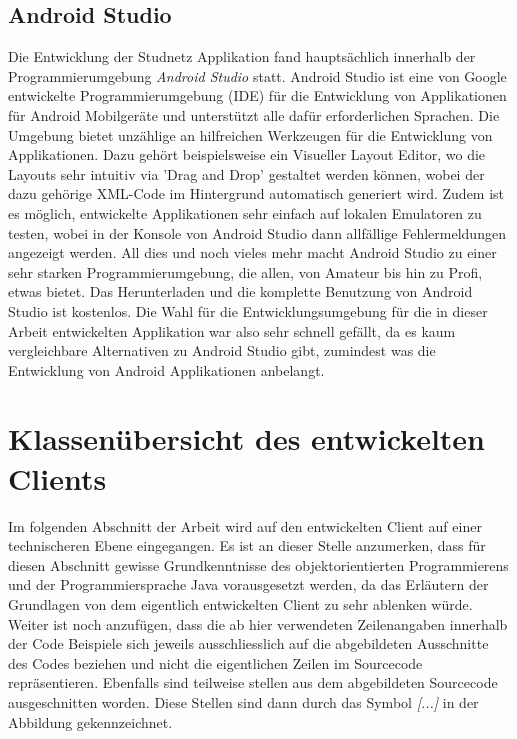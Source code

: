 \documentclass[../main.tex]{subfiles}
\begin{document}
	\subsection{Android Studio}
	Die Entwicklung der Studnetz Applikation fand hauptsächlich innerhalb der Programmierumgebung \emph{Android Studio} statt. Android Studio ist eine von Google entwickelte Programmierumgebung (IDE) für die Entwicklung von Applikationen für Android Mobilgeräte und unterstützt alle dafür erforderlichen Sprachen. Die Umgebung bietet unzählige an hilfreichen Werkzeugen für die Entwicklung von Applikationen. Dazu gehört beispielsweise ein Visueller Layout Editor, wo die Layouts sehr intuitiv via 'Drag and Drop' gestaltet werden können, wobei der dazu gehörige XML-Code im Hintergrund automatisch generiert wird. Zudem ist es möglich, entwickelte Applikationen sehr einfach auf lokalen Emulatoren zu testen, wobei in der Konsole von Android Studio dann allfällige Fehlermeldungen angezeigt werden. All dies und noch vieles mehr macht Android Studio zu einer sehr starken Programmierumgebung, die allen, von Amateur bis hin zu Profi, etwas bietet. Das Herunterladen und die komplette Benutzung von Android Studio ist kostenlos. Die Wahl für die Entwicklungsumgebung für die in dieser Arbeit entwickelten Applikation war also sehr schnell gefällt, da es kaum vergleichbare Alternativen zu Android Studio gibt, zumindest was die Entwicklung von Android Applikationen anbelangt.
	
	\section{Klassenübersicht des entwickelten Clients}
	Im folgenden Abschnitt der Arbeit wird auf den entwickelten Client auf einer technischeren Ebene eingegangen. Es ist an dieser Stelle anzumerken, dass für diesen Abschnitt gewisse Grundkenntnisse des objektorientierten Programmierens und der Programmiersprache Java vorausgesetzt werden, da das Erläutern der Grundlagen von dem eigentlich entwickelten Client zu sehr ablenken würde. Weiter ist noch anzufügen, dass die ab hier verwendeten Zeilenangaben innerhalb der Code Beispiele sich jeweils ausschliesslich auf die abgebildeten Ausschnitte des Codes beziehen und nicht die eigentlichen Zeilen im Sourcecode repräsentieren. Ebenfalls sind teilweise stellen aus dem abgebildeten Sourcecode ausgeschnitten worden. Diese Stellen sind dann durch das Symbol \emph{[...]} in der Abbildung gekennzeichnet.
	
	
\end{document}

